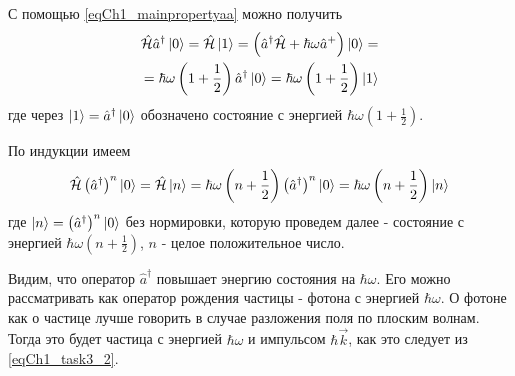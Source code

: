 С помощью \eqref{eqCh1_mainpropertyaa} можно получить
\begin{eqnarray}
\hat{\mathcal{H}} \hat{a}^{\dag}\ket{0} = 
\hat{\mathcal{H}} \ket{1} =
\left(\hat{a}^{\dag} \hat{\mathcal{H}} + \hbar \omega \hat{a}^{+} \right)
\ket{0} = 
\nonumber \\
= \hbar \omega \left(1 + \frac{1}{2}\right)
\hat{a}^{\dag} \ket{0} = 
\hbar \omega \left(1 + \frac{1}{2}\right)
\ket{1}
\end{eqnarray}
где через $\ket{1} = \hat{a}^{\dag} \ket{0}$ обозначено
состояние с энергией $\hbar \omega \left(1 + \frac{1}{2}\right)$.

По индукции имеем
\begin{equation}
\hat{\mathcal{H}} \left(\hat{a}^{\dag}\right)^n\ket{0} = 
\hat{\mathcal{H}} \ket{n} 
= \hbar \omega \left(n + \frac{1}{2}\right)
\left(\hat{a}^{\dag}\right)^n\ket{0} = 
\hbar \omega \left(n + \frac{1}{2}\right)
\ket{n}
\label{eqCh1_aplusinduction}
\end{equation}
где
$\ket{n} = \left(\hat{a}^{\dag}\right)^n\ket{0}$   
без нормировки, которую проведем далее -  состояние с энергией  
$\hbar \omega \left(n + \frac{1}{2}\right)$,  $n$  -  целое
положительное число.

Видим, что оператор  $\hat{a}^{\dag}$  повышает энергию состояния на
$\hbar \omega$.  Его можно рассматривать как оператор рождения частицы
- фотона  с энергией  $\hbar \omega$.  О фотоне как о частице лучше
говорить в случае разложения поля по плоским волнам. Тогда это будет
частица с энергией $\hbar \omega$ и импульсом $\hbar \vec{k}$,  как
это следует из \eqref{eqCh1_task3_2}. 
  
